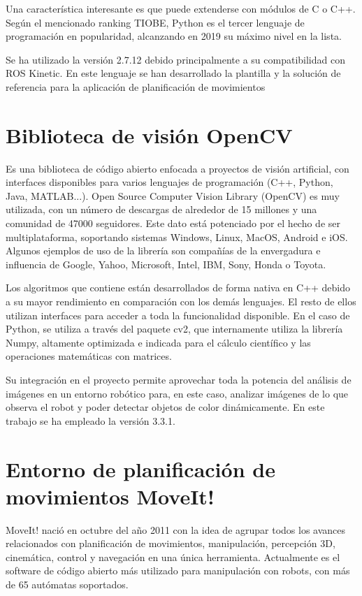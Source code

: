 \documentclass[12pt,spanish,chapterprefix, numbers=noenddot]{book}
\numberwithin{equation}{section}
\numberwithin{figure}{section}
\begin{document}
Una característica interesante es que puede extenderse con módulos de C o C++.
Según el mencionado ranking TIOBE, Python es el tercer lenguaje de programación en popularidad, alcanzando en 2019 su máximo nivel en la lista. 

Se ha utilizado la versión 2.7.12 debido principalmente a su compatibilidad con ROS Kinetic. En este lenguaje se han desarrollado la plantilla y la solución de referencia para la aplicación de planificación de movimientos 

\section{Biblioteca de visión OpenCV}
Es una biblioteca de código abierto enfocada a proyectos de visión artificial, con interfaces disponibles para varios lenguajes de programación (C++, Python, Java, MATLAB...). Open Source Computer Vision Library (OpenCV) \cite{opencv} es muy utilizada, con un número de descargas de alrededor de 15 millones y una comunidad de 47000 seguidores. Este dato está potenciado por el hecho de ser multiplataforma, soportando sistemas Windows, Linux, MacOS, Android e iOS. 
Algunos ejemplos de uso de la librería son compañías de la envergadura e influencia de Google, Yahoo, Microsoft, Intel, IBM, Sony, Honda o Toyota.

Los algoritmos que contiene están desarrollados de forma nativa en C++ debido a su mayor rendimiento en comparación con los demás lenguajes. El resto de ellos utilizan interfaces para acceder a toda la funcionalidad disponible. 
En el caso de Python, se utiliza a través del paquete cv2, que internamente utiliza la librería Numpy, altamente optimizada e indicada para el cálculo científico y las operaciones matemáticas con matrices. 

Su integración en el proyecto permite aprovechar toda la potencia del análisis de imágenes en un entorno robótico para, en este caso, analizar imágenes de lo que observa el robot y poder detectar objetos de color dinámicamente. En este trabajo se ha empleado la versión 3.3.1.

\section{Entorno de planificación de movimientos MoveIt!}
MoveIt! nació en octubre del año 2011 con la idea de agrupar todos los avances relacionados con planificación de movimientos, manipulación, percepción 3D, cinemática, control y navegación en una única herramienta. Actualmente es el software de código abierto más utilizado para manipulación con robots, con más de 65 autómatas soportados. 
\end{document}
